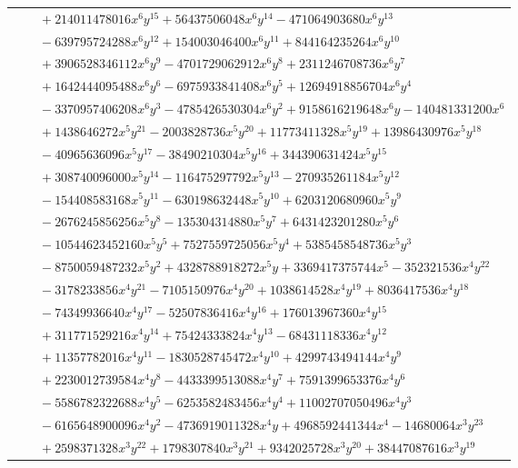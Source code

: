 \documentclass[11pt]{article}
\begin{document}
\begin{longtable}{@{}ll@{}}
 & $\quad +214011478016x^{6}y^{15}+56437506048x^{6}y^{14}-471064903680x^{6}y^{13}$\\
 & $\quad -639795724288x^{6}y^{12}+154003046400x^{6}y^{11}+844164235264x^{6}y^{10}$\\
 & $\quad +3906528346112x^{6}y^{9}-4701729062912x^{6}y^{8}+2311246708736x^{6}y^{7}$\\
 & $\quad +1642444095488x^{6}y^{6}-6975933841408x^{6}y^{5}+12694918856704x^{6}y^{4}$\\
 & $\quad -3370957406208x^{6}y^{3}-4785426530304x^{6}y^{2}+9158616219648x^{6}y-140481331200x^{6}$\\
 & $\quad +1438646272x^{5}y^{21}-2003828736x^{5}y^{20}+11773411328x^{5}y^{19}+13986430976x^{5}y^{18}$\\
 & $\quad -40965636096x^{5}y^{17}-38490210304x^{5}y^{16}+344390631424x^{5}y^{15}$\\
 & $\quad +308740096000x^{5}y^{14}-116475297792x^{5}y^{13}-270935261184x^{5}y^{12}$\\
 & $\quad -154408583168x^{5}y^{11}-630198632448x^{5}y^{10}+6203120680960x^{5}y^{9}$\\
 & $\quad -2676245856256x^{5}y^{8}-135304314880x^{5}y^{7}+6431423201280x^{5}y^{6}$\\
 & $\quad -10544623452160x^{5}y^{5}+7527559725056x^{5}y^{4}+5385458548736x^{5}y^{3}$\\
 & $\quad -8750059487232x^{5}y^{2}+4328788918272x^{5}y+3369417375744x^{5}-352321536x^{4}y^{22}$\\
 & $\quad -3178233856x^{4}y^{21}-7105150976x^{4}y^{20}+1038614528x^{4}y^{19}+8036417536x^{4}y^{18}$\\
 & $\quad -74349936640x^{4}y^{17}-52507836416x^{4}y^{16}+176013967360x^{4}y^{15}$\\
 & $\quad +311771529216x^{4}y^{14}+75424333824x^{4}y^{13}-68431118336x^{4}y^{12}$\\
 & $\quad +11357782016x^{4}y^{11}-1830528745472x^{4}y^{10}+4299743494144x^{4}y^{9}$\\
 & $\quad +2230012739584x^{4}y^{8}-4433399513088x^{4}y^{7}+7591399653376x^{4}y^{6}$\\
 & $\quad -5586782322688x^{4}y^{5}-6253582483456x^{4}y^{4}+11002707050496x^{4}y^{3}$\\
 & $\quad -6165648900096x^{4}y^{2}-4736919011328x^{4}y+4968592441344x^{4}-14680064x^{3}y^{23}$\\
 & $\quad +2598371328x^{3}y^{22}+1798307840x^{3}y^{21}+9342025728x^{3}y^{20}+38447087616x^{3}y^{19}$\\

\end{longtable}
\end{document}
